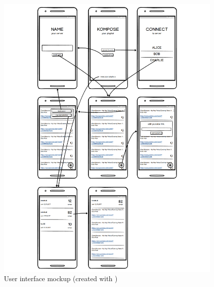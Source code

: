 \documentclass{report}
\begin{document}


\begin{figure}
    \includegraphics[width=\textwidth]{../design/mockups.pdf}
    \caption{User interface mockup (created with \cite{balsamiq})}
\end{figure}
\end{document}
